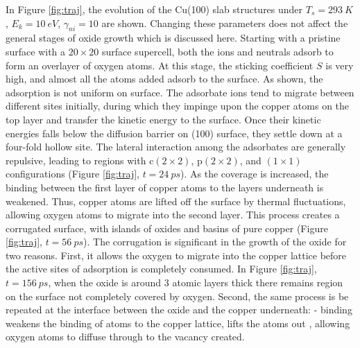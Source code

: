 \documentclass[manuscript=cmatex]{achemso}
\begin{document}
In Figure \ref{fig:traj}, the evolution of the Cu(100) slab structures under $T_s=\SI{293}{K}$, $E_k=\SI{10}{eV}$, $\gamma_{ni}=10$ are shown. Changing these parameters does not affect the general stages of oxide growth which is discussed here. Starting with a pristine surface with a $20\times20$ surface supercell, both the ions and neutrals adsorb to form an overlayer of oxygen atoms. At this stage, the sticking coefficient $S$ is very high, and almost all the atoms added adsorb to the surface. As shown, the adsorption is not uniform on surface. The adsorbate ions tend to migrate between different sites initially, during which they impinge upon the copper atoms on the top layer and transfer the kinetic energy to the surface. Once their kinetic energies falls below the diffusion barrier on (100) surface, they settle down at a four-fold hollow site. The lateral interaction among the adsorbates are generally repulsive, leading to regions with c$(2\times2)$, p$(2\times2)$, and $(1\times1)$ configurations (Figure \ref{fig:traj}, $t=\SI{24}{ps}$). As the coverage is increased, the binding between the first layer of copper atoms to the layers underneath is weakened. Thus, copper atoms are lifted off the surface by thermal fluctuations, allowing oxygen atoms to migrate into the second layer. This process creates a corrugated surface, with islands of oxides and basins of pure copper (Figure \ref{fig:traj}, $t=\SI{56}{ps}$). The corrugation is significant in the growth of the oxide for two reasons. First, it allows the oxygen to migrate into the copper lattice before the active sites of adsorption is completely consumed. In Figure \ref{fig:traj}, $t=\SI{156}{ps}$, when the oxide is around 3 atomic layers thick there remains region on the surface not completely covered by oxygen. Second, the same process is be repeated at the interface between the oxide and the copper underneath: - binding weakens the binding of  atoms to the copper lattice, lifts the  atoms out , allowing oxygen atoms to diffuse through to the vacancy created.
\end{document}
